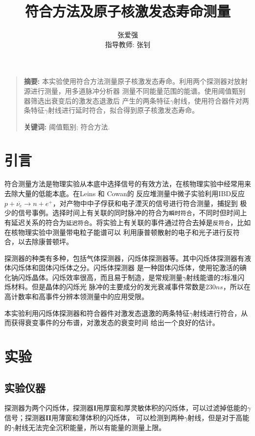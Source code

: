 \documentclass[12pt]{ctexart}
\title{符合方法及原子核激发态寿命测量}
\author{张爱强\\指导教师: 张钊}
\date{}
\newenvironment{sciabstract}{%
\begin{quote} \textbf{摘要: }}
{\end{quote}}
\begin{document}
\maketitle
\begin{sciabstract}
    本实验使用符合方法测量原子核激发态寿命。利用两个探测器对放射源进行测量，用多道脉冲分析器
    测量不同能量范围的能谱。使用阈值甄别器筛选出衰变后的激发态退激后
    产生的两条特征$\gamma$射线，使用符合器件对两条特征$\gamma$射线进行延时符合，拟合得到原子核激发态寿命。
    \par\textbf{关键词: } 阈值甄别; 符合方法.
\end{sciabstract}
\section{引言}
符合测量方法是物理实验从本底中选择信号的有效方法，在核物理实验中经常用来去除大量的低能本底。在Leins 和 Cowan的
反应堆测量中微子实验利用IBD反应$p+\overline{\nu_e}\to n+e^+$，对产物中中子俘获和电子湮灭的信号进行符合测量，捕捉到
极少的信号事例\cite{doi:10.1063/1.1770939}。选择时间上有关联的同时脉冲的符合为\texttt{瞬时符合}，不同时但时间上
有延迟关系的符合为\texttt{延迟符合}。将实验上有关联的事件通过符合去掉是\texttt{反符合}，比如在核物理实验中测量带电粒子能谱可以
利用康普顿散射的电子和光子进行反符合，以去除康普顿坪\cite{nuclear}。

探测器的种类有多种，包括气体探测器，闪烁体探测器等\cite{nuclear}。其中闪烁体探测器有液体闪烁体和固体闪烁体之分。闪烁体探测器
是一种固体闪烁体，使用铊激活的碘化钠闪烁晶体。闪烁效率很高，而且易于制造，是常规测量$\gamma$射线能谱的2标准闪烁材料。但是晶体的闪烁光
脉冲的主要成分的发光衰减事件常数是$230ns$，所以在高计数率和高事件分辨本领测量中的应用受限。

本实验利用闪烁体探测器和符合器件对激发态退激的两条特征$\gamma$射线进行符合，从而获得衰变事件的分布谱，对激发态的衰变时间
给出一个良好的估计。
\section{实验}
\subsection{实验仪器}
探测器为两个闪烁体，探测器$\mathbf{I}$用厚窗和厚灵敏体积的闪烁体，可以过滤掉低能的$\gamma$信号；探测器$\mathbf{II}$用薄窗和薄体积的闪烁体，
可以检测到两种$\gamma$射线，但是对于高能的$\gamma$射线无法完全沉积能量，所以有能量的测量上限。
\end{document}
